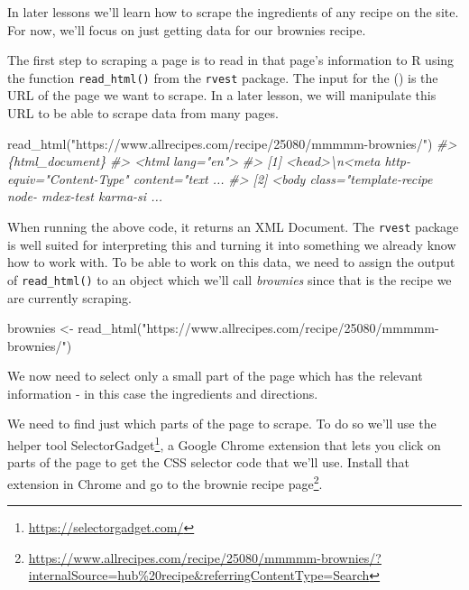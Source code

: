 \documentclass[
]{krantz}
\makeatletter
\newenvironment{Shaded}{\begin{snugshade}}{\end{snugshade}}
\newcommand{\CommentTok}[1]{\textcolor[rgb]{0.37,0.37,0.37}{\textit{#1}}}
\newcommand{\FunctionTok}[1]{\textcolor[rgb]{0,0,0}{#1}}
\newcommand{\NormalTok}[1]{#1}
\newcommand{\OtherTok}[1]{\textcolor[rgb]{0.37,0.37,0.37}{#1}}
\newcommand{\StringTok}[1]{\textcolor[rgb]{0.5,0.5,0.5}{#1}}
\renewcommand{\href}[2]{#2\footnote{\url{#1}}}
\newenvironment{kframe}{%
\medskip{}
\setlength{\fboxsep}{.8em}
 \def\at@end@of@kframe{}%
 \ifinner\ifhmode%
  \def\at@end@of@kframe{\end{minipage}}%
  \begin{minipage}{\columnwidth}%
 \fi\fi%
 \def\FrameCommand##1{\hskip\@totalleftmargin \hskip-\fboxsep
 \colorbox{shadecolor}{##1}\hskip-\fboxsep
     \hskip-\linewidth \hskip-\@totalleftmargin \hskip\columnwidth}%
 \MakeFramed {\advance\hsize-\width
   \@totalleftmargin\z@ \linewidth\hsize
   \@setminipage}}%
 {\par\unskip\endMakeFramed%
 \at@end@of@kframe}
\renewenvironment{Shaded}{\begin{kframe}}{\end{kframe}}
\makeatother
\begin{document}
In later lessons we'll learn how to scrape the ingredients
of any recipe on the site. For now, we'll focus on just
getting data for our brownies recipe.

The first step to scraping a page is to read in that page's
information to R using the function \texttt{read\_html()}
from the \texttt{rvest} package. The input for the () is the
URL of the page we want to scrape. In a later lesson, we
will manipulate this URL to be able to scrape data from many
pages.

\begin{Shaded}
\begin{Highlighting}[]
\FunctionTok{read\_html}\NormalTok{(}\StringTok{"https://www.allrecipes.com/recipe/25080/mmmmm{-}brownies/"}\NormalTok{)}
\CommentTok{\#\textgreater{} \{html\_document\}}
\CommentTok{\#\textgreater{} \textless{}html lang="en"\textgreater{}}
\CommentTok{\#\textgreater{} [1] \textless{}head\textgreater{}\textbackslash{}n\textless{}meta http{-}equiv="Content{-}Type" content="text ...}
\CommentTok{\#\textgreater{} [2] \textless{}body class="template{-}recipe node{-} mdex{-}test karma{-}si ...}
\end{Highlighting}
\end{Shaded}

When running the above code, it returns an XML Document. The
\texttt{rvest} package is well suited for interpreting this
and turning it into something we already know how to work
with. To be able to work on this data, we need to assign the
output of \texttt{read\_html()} to an object which we'll
call \emph{brownies} since that is the recipe we are
currently scraping.

\begin{Shaded}
\begin{Highlighting}[]
\NormalTok{brownies }\OtherTok{\textless{}{-}} \FunctionTok{read\_html}\NormalTok{(}\StringTok{"https://www.allrecipes.com/recipe/25080/mmmmm{-}brownies/"}\NormalTok{)}
\end{Highlighting}
\end{Shaded}

We now need to select only a small part of the page which
has the relevant information - in this case the ingredients
and directions.

We need to find just which parts of the page to scrape. To
do so we'll use the helper tool
\href{https://selectorgadget.com/}{SelectorGadget}, a Google
Chrome extension that lets you click on parts of the page to
get the CSS selector code that we'll use. Install that
extension in Chrome and go to the
\href{https://www.allrecipes.com/recipe/25080/mmmmm-brownies/?internalSource=hub\%20recipe\&referringContentType=Search}{brownie
recipe page}.
\end{document}

